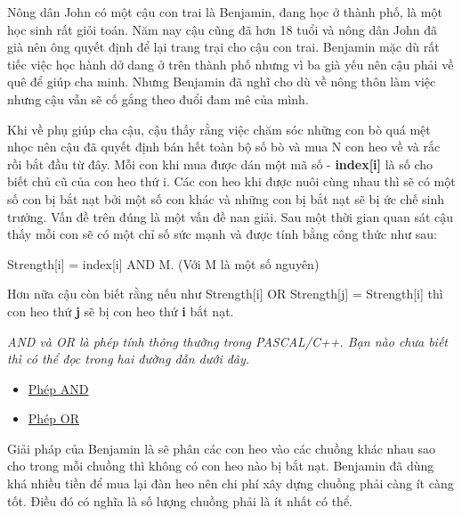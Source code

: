 Nông dân John có một cậu con trai là Benjamin, đang học ở thành phố, là một học sinh rất giỏi toán. Năm nay cậu cũng đã hơn 18 tuổi và nông dân John đã già nên ông quyết định để lại trang trại cho cậu con trai. Benjamin mặc dù rất tiếc việc học hành dở dang ở trên thành phố nhưng vì ba già yếu nên cậu phải về quê để giúp cha minh. Nhưng Benjamin đã nghĩ cho dù về nông thôn làm việc nhưng cậu vẫn sẽ cố gắng theo đuổi đam mê của mình.

Khi về phụ giúp cha cậu, cậu thấy rằng việc chăm sóc những con bò quá mệt nhọc nên cậu đã quyết định bán hết toàn bộ số bò và mua N con heo về và rắc rồi bắt đầu từ đây. Mỗi con khi mua được dán một mã số - \textbf{ index[i] } là số cho biết chủ cũ của con heo thứ i. Các con heo khi được nuôi cùng nhau thì sẽ có một số con bị bắt nạt bởi một số con khác và những con bị bắt nạt sẽ bị ức chế sinh trưởng. Vấn đề trên đúng là một vấn đề nan giải. Sau một thời gian quan sát cậu thấy mỗi con sẽ có một chỉ số sức mạnh và được tính bằng công thức như sau:

Strength[i] = index[i] AND M. (Với M là một số nguyên)

Hơn nữa cậu còn biết rằng nếu như Strength[i] OR Strength[j] = Strength[i] thì con heo thứ \textbf{ j } sẽ bị con heo thứ \textbf{ i } bắt nạt.

\emph{AND và OR là phép tính thông thường trong PASCAL/C++. Bạn nào chưa biết thì có thể đọc trong hai đường dẫn dưới đây. }
\begin{itemize}
	\item \href{http://vi.wikipedia.org/wiki/Ph%C3%A9p_to%C3%A1n_thao_t%C3%A1c_bit#AND}{Phép AND }
	\item \href{http://vi.wikipedia.org/wiki/Ph%C3%A9p_to%C3%A1n_thao_t%C3%A1c_bit#OR}{Phép OR }
\end{itemize}

Giải pháp của Benjamin là sẽ phân các con heo vào các chuồng khác nhau sao cho trong mỗi chuồng thì không có con heo nào bị bắt nạt. Benjamin đã dùng khá nhiều tiền để mua lại đàn heo nên chi phí xây dựng chuồng phải càng ít càng tốt. Điều đó có nghĩa là số lượng chuồng phải là ít nhất có thể.

 